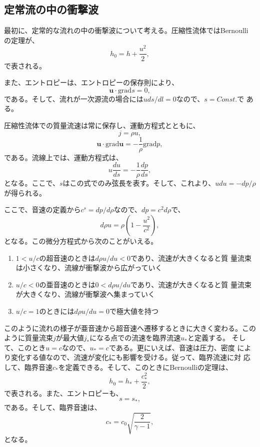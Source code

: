 \subsection{定常流の中の衝撃波}
最初に、定常的な流れの中の衝撃波について考える。圧縮性流体ではBernoulli
の定理が、
\begin{equation}
 h_0 = h + \frac{u^2}{2},
\end{equation}
で表される。

また、エントロピーは、エントロピーの保存則により、
\begin{equation}
 \bm{u}\cdot\text{grad}s = 0,
\end{equation}
である。そして、流れが一次源流の場合には$u ds/dl=0$なので、$s=Const.$で
ある。

圧縮性流体での質量流速は常に保存し、運動方程式とともに、
\begin{equation}
 j = \rho u,
\end{equation}
\begin{equation}
 \bm{u}\cdot\text{grad}\bm{u} = -\frac{1}{\rho}\text{grad}p,
\end{equation}
である。流線上では、運動方程式は、
\begin{equation}
 u\frac{du}{ds} = -\frac{1}{\rho}\frac{dp}{ds},
\end{equation}
となる。ここで、$s$はこの式でのみ弦長を表す。そして、これより、$udu =
-dp/\rho$が得られる。

ここで、音速の定義から$c^s = dp/d\rho$なので、$dp = c^2d\rho$で、
\begin{equation}
 d\rho u = 
  \rho\left(1-\frac{u^2}{c^2}\right),
\end{equation}
となる。この微分方程式から次のことがいえる。

\begin{enumerate}
 \item $1<u/c$の超音速のときは$d\rho u/du<0$であり、流速が大きくなると質
       量流束は小さくなり、流線が衝撃波から広がっていく
 \item $u/c<0$の亜音速のときは$0<d\rho u/du$であり、流速が大きくなると質
       量流束が大きくなり、流線が衝撃波へ集まっていく
 \item $u/c=1$のときには$d\rho u/du=0$で極大値を持つ
\end{enumerate}

このように流れの様子が亜音速から超音速へ遷移するときに大きく変わる。この
ように質量流束$j$が最大値$j_*$になる点での流速を臨界流速$u_*$と定義する。
そして、このとき$u=c$なので、$u_*=c$である。更にいえば、音速は圧力、密度
により変化する値なので、流速が変化にも影響を受ける。従って、臨界流速に対
応して、臨界音速$c_*$を定義できる。そして、このときにBernoulliの定理は、
\begin{equation}
 h_0 = h_* + \frac{c_*^2}{2},
\end{equation}
で表される。また、エントロピーも、
\begin{equation}
 s=s_*,
\end{equation}
である。そして、臨界音速は、
\begin{equation}
 c_* = c_0\sqrt{\frac{2}{\gamma - 1}},
\end{equation}
となる。

